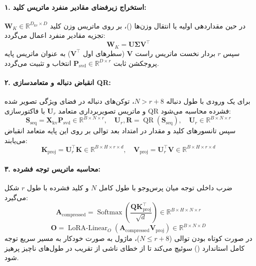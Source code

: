 \paragraph{۱. استخراج زیرفضای مقادیر منفرد ماتریس کلید:}
در حین مقداردهی اولیه یا انتقال وزن‌ها ()، بر روی ماتریس وزن کلید $\mathbf{W}_K \in \mathbb{R}^{D_{\text{kv}} \times D}$ تجزیه مقادیر منفرد اعمال می‌گردد:
\begin{equation}
\mathbf{W}_K = \mathbf{U} \mathbf{\Sigma} \mathbf{V}^\top
\end{equation}
سپس $r$ بردار نخست ماتریس راست $\mathbf{V}$ (سطرهای اول $\mathbf{V}^\top$) به عنوان ماتریس پایه پروجکشن ثابت $\mathbf{P}_{\text{svd}} \in \mathbb{R}^{D \times r}$ انتخاب و تثبیت می‌گردد.

\paragraph{۲. انقباض دنباله و متعامدسازی QR:}
برای یک ورودی با طول دنباله $N > r + 8$، توکن‌های دنباله در فضای ویژگی تصویر شده و ماتریس تصویربرداری متعامد $\mathbf{U}_r$ با فاکتورسازی QR فشرده محاسبه می‌شود:
\begin{equation}
\mathbf{S}_{\text{seq}} = \mathbf{X}_{\text{kv}} \mathbf{P}_{\text{svd}} \in \mathbb{R}^{B \times N \times r}, \quad \mathbf{U}_r, \mathbf{R} = \operatorname{QR}(\mathbf{S}_{\text{seq}}), \quad \mathbf{U}_r \in \mathbb{R}^{B \times N \times r}
\end{equation}
سپس تانسورهای کلید و مقدار در امتداد بعد توالی بر روی این پایه متعامد انقباض می‌یابند:
\begin{equation}
\mathbf{K}_{\text{proj}} = \mathbf{U}_r^\top \mathbf{K} \in \mathbb{R}^{B \times H \times r \times d}, \quad \mathbf{V}_{\text{proj}} = \mathbf{U}_r^\top \mathbf{V} \in \mathbb{R}^{B \times H \times r \times d}
\end{equation}

\paragraph{۳. محاسبه ماتریس توجه فشرده:}
ضرب داخلی توجه میان پرس‌وجو با طول کامل $N$ و کلید فشرده با طول $r$ شکل می‌گیرد:
\begin{equation}
\mathbf{A}_{\text{compressed}} = \operatorname{Softmax}\left(\frac{\mathbf{Q} \mathbf{K}_{\text{proj}}^\top}{\sqrt{d}}\right) \in \mathbb{R}^{B \times H \times N \times r}
\end{equation}
\begin{equation}
\mathbf{O} = \operatorname{LoRA-Linear}_O\left(\mathbf{A}_{\text{compressed}} \mathbf{V}_{\text{proj}}\right) \in \mathbb{R}^{B \times N \times D}
\end{equation}
در صورت کوتاه بودن توالی ($N \le r + 8$)، ماژول به صورت خودکار به مسیر سریع توجه کامل استاندارد () سوئیچ می‌کند تا از خطای ناشی از تقریب در طول‌های ناچیز پرهیز شود.

